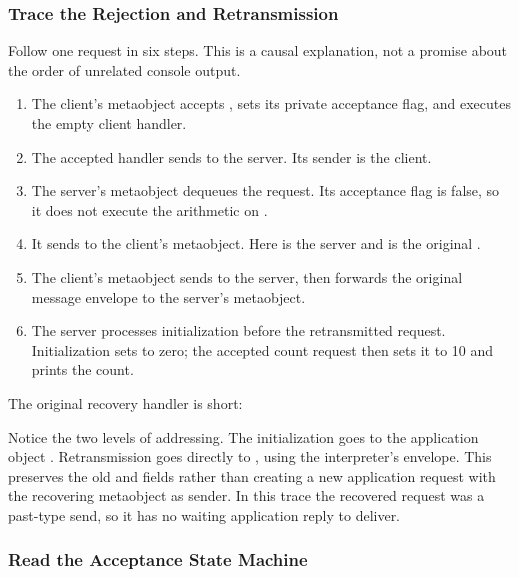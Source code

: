 \subsubsection{Trace the Rejection and Retransmission}

Follow one request in six steps. This is a causal explanation, not a promise
about the order of unrelated console output.

\begin{enumerate}
\item The client's metaobject accepts \code{[:initialize]}, sets its private
acceptance flag, and executes the empty client handler.
\item The accepted  handler sends
\code{[:count-up 10]} to the server. Its sender is the client.
\item The server's metaobject dequeues the request. Its acceptance flag is
false, so it does not execute the arithmetic on .
\item It sends  to the
client's metaobject. Here  is the server and
 is the original \code{[:count-up 10]}.
\item The client's metaobject sends \code{[:initialize]} to the server,
then forwards the original message envelope to the server's metaobject.
\item The server processes initialization before the retransmitted request.
Initialization sets  to zero; the accepted count request
then sets it to 10 and prints the count.
\end{enumerate}

The original recovery handler is short:


Notice the two levels of addressing. The initialization goes to the
application object . Retransmission goes directly to
, using the interpreter's  envelope.
This preserves the old  and  fields rather than
creating a new application request with the recovering metaobject as sender.
In this trace the recovered request was a past-type send, so it has no
waiting application reply to deliver.

\subsubsection{Read the Acceptance State Machine}


